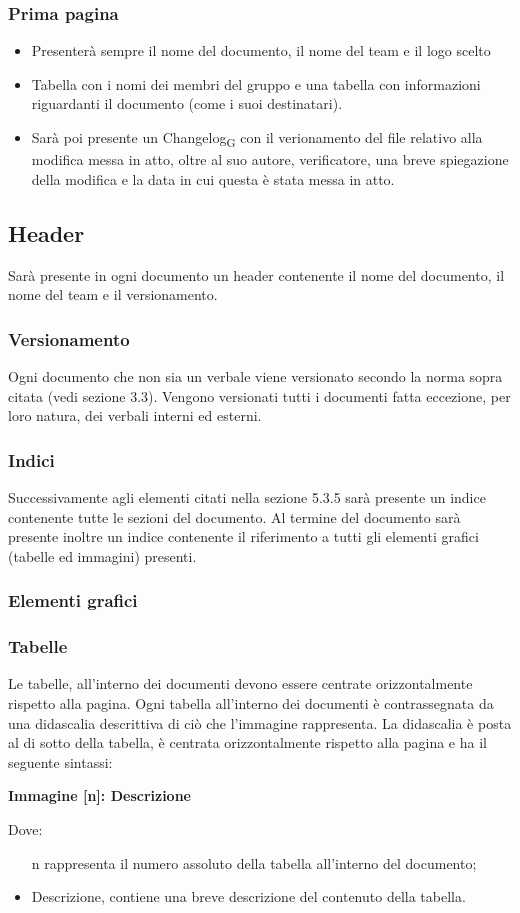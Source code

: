 \documentclass{article}
\begin{document}
\subsubsection*{Prima pagina}
\begin{itemize}
    \item Presenterà sempre il nome del documento, il nome del team e il logo scelto
    \item Tabella con i nomi dei membri del gruppo e una tabella con informazioni riguardanti il documento (come i suoi destinatari).
    \item Sarà poi presente un Changelog\textsubscript{G} con il verionamento del file relativo alla modifica messa in atto, oltre al suo autore, verificatore, una breve spiegazione della modifica e la data in cui questa è stata messa in atto.
\end{itemize}

\subsection{Header}
Sarà presente in ogni documento un header contenente il nome del documento, il nome del team e il versionamento.

\subsubsection*{Versionamento}
Ogni documento che non sia un verbale viene versionato secondo la norma sopra citata (vedi sezione 3.3). Vengono versionati tutti i documenti fatta eccezione, per loro natura, dei verbali interni ed esterni.
\subsubsection*{Indici}
Successivamente agli elementi citati nella sezione 5.3.5 sarà presente un indice contenente tutte le sezioni del documento. Al termine del documento sarà presente inoltre un indice contenente il riferimento a tutti gli elementi grafici (tabelle ed immagini) presenti. 

\subsubsection{Elementi grafici}
\subsubsection{Tabelle}
Le tabelle, all’interno dei documenti devono essere centrate orizzontalmente rispetto alla pagina.
Ogni tabella all’interno dei documenti è contrassegnata da una didascalia descrittiva di ciò che
l’immagine rappresenta. La didascalia è posta al di sotto della tabella, è centrata orizzontalmente
rispetto alla pagina e ha il seguente sintassi:
\begin{center}
\textbf{Immagine [n]: Descrizione}
\end{center}
Dove:
\begin{itemize}
    \item [n] rappresenta il numero assoluto della tabella all’interno del documento;
    \item Descrizione, contiene una breve descrizione del contenuto della tabella.
\end{itemize}
\end{document}
